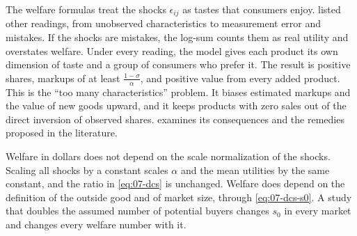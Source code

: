 The welfare formulas treat the shocks $\epsilon_{ij}$ as tastes that consumers enjoy. 
listed other readings, from unobserved characteristics to measurement error and mistakes. If the shocks are
mistakes, the log-sum counts them as real utility and overstates welfare. Under every reading, the model gives each
product its own dimension of taste and a group of consumers who prefer it. The result is positive shares, markups
of at least $\frac{1-\sigma}{\alpha}$, and positive value from every added product. This is the ``too many
characteristics'' problem. It biases estimated markups and the value of new goods upward, and it keeps products with zero
sales out of the direct inversion of observed shares.  examines its consequences and the remedies proposed
in the literature.

Welfare in dollars does not depend on the scale normalization of the shocks. Scaling all shocks by a constant scales
$\alpha$ and the mean utilities by the same constant, and the ratio in \eqref{eq:07-dcs} is unchanged. Welfare does
depend on the definition of the outside good and of market size, through \eqref{eq:07-dcs-s0}. A study that doubles the
assumed number of potential buyers changes $s_0$ in every market and changes every welfare number with it.
